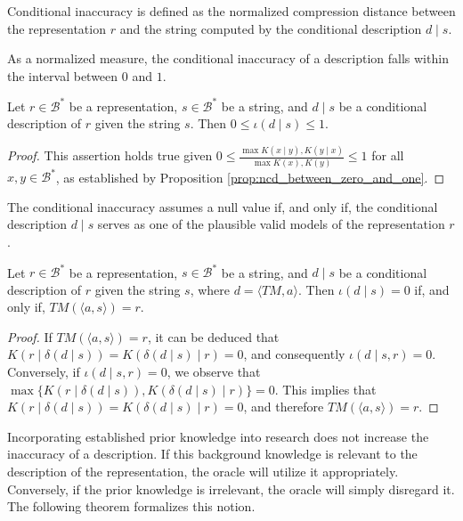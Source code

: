 Conditional inaccuracy is defined as the normalized compression distance between the representation $r$ and the string computed by the conditional description $d \mid s$.

As a normalized measure, the conditional inaccuracy of a description falls within the interval between $0$ and $1$.

\begin{proposition}
\label{prop:range_conditional_inaccuracy}
Let $r \in \mathcal{B}^\ast$ be a representation, $s \in \mathcal{B}^\ast$ be a string, and $d \mid s$ be a conditional description of $r$ given the string $s$. Then $0 \leq \iota(d \mid s) \leq 1$.
\end{proposition}
\begin{proof}
This assertion holds true given $0 \leq \frac{ \max{ K(x \mid y), K(y \mid x) } } { \max{ K(x), K(y) } } \leq 1$ for all $x, y \in \mathcal{B}^\ast$, as established by Proposition \ref{prop:ncd_between_zero_and_one}.
\end{proof}

The conditional inaccuracy assumes a null value if, and only if, the conditional description $d \mid s$ serves as one of the plausible valid models of the representation $r$.

\begin{proposition}\label{prop:perfect_description}
Let $r \in \mathcal{B}^\ast$ be a representation, $s \in \mathcal{B}^\ast$ be a string, and $d \mid s$ be a conditional description of $r$ given the string $s$, where $d = \langle TM, a \rangle$. Then $\iota(d \mid s) = 0$ if, and only if, $TM \left(\langle a, s \rangle \right) = r$.
\end{proposition}
\begin{proof}
If $TM \left(\langle a, s \rangle \right) = r$, it can be deduced that $K \left( r \mid \delta(d \mid s) \right) = K \left( \delta(d \mid s) \mid r \right) = 0$, and consequently $\iota(d \mid s, r) = 0$. Conversely, if $\iota(d \mid s, r) = 0$, we observe that $\max\{ K \left( r \mid \delta(d \mid s) \right), K \left( \delta(d \mid s) \mid r \right) \} = 0$. This implies that $K \left( r \mid \delta(d \mid s) \right) = K \left( \delta(d \mid s) \mid r \right) = 0$, and therefore $TM \left(\langle a, s \rangle \right) = r$.
\end{proof}

Incorporating established prior knowledge into research does not increase the inaccuracy of a description. If this background knowledge is relevant to the description of the representation, the oracle will utilize it appropriately. Conversely, if the prior knowledge is irrelevant, the oracle will simply disregard it. The following theorem formalizes this notion.

